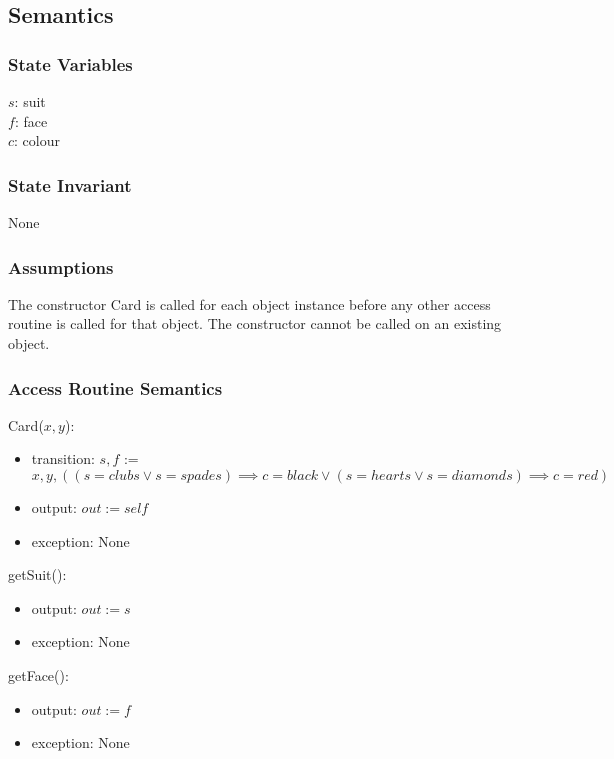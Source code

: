 \documentclass[12pt]{article}
\begin{document}
\subsection* {Semantics}

\subsubsection* {State Variables}

$s$: suit\\
$f$: face\\
$c$: colour

\subsubsection* {State Invariant}

None

\subsubsection* {Assumptions}

The constructor Card is called for each object instance before any other
access routine is called for that object.  The constructor cannot be called on
an existing object.

\subsubsection* {Access Routine Semantics}

Card($x, y$):
\begin{itemize}
	\item transition: $s,f$ := $x,y, ((s = clubs \lor s = spades) \implies c = black \lor (s = hearts \lor s =diamonds) \implies c = red)$ 
	\item output: $out := \mathit{self}$
	\item exception: None
\end{itemize}

\noindent getSuit():
\begin{itemize}
	\item output: $out := s$
	\item exception: None
\end{itemize}

\noindent getFace():
\begin{itemize}
	\item output: $out := f$
	\item exception: None
\end{itemize}
\end{document}
